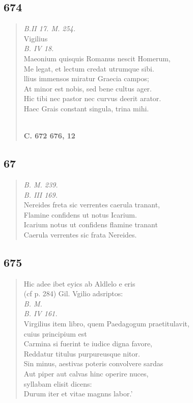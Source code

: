 \documentclass[11pt, a4paper]{report}
\begin{document}
            \subsection*{674}
      \begin{verse}
      \textit{B.II 17. M. 254.} \\ Vigilius \\ \textit{B. IV 18.} \\ Maeonium quisquis Romanus nescit Homerum, \\ Me legat, et lectum credat utrumque sibi. \\ llius immensos miratur Graecia campos; \\ At minor est nobis, sed bene cultus ager. \\ Hic tibi nec pastor nec curvus deerit arator. \\ Haec Grais constant singula, trina mihi. \\ 
        ﻿\pagebreak 
    \begin{center} \textbf{C. 672 676, 12} \end{center} \marginpar{[151]} 
      \end{verse}
  
            \subsection*{67}
      \begin{verse}
      \textit{B. M. 239.} \\ \textit{B. III 169.} \\ Nereides freta sic verrentes caerula tranant, \\ Flamine confidens ut notus Icarium. \\ Icarium notus ut confidens flamine tranant \\ Caerula verrentes sic frata Nereides. \\ 
      \end{verse}
  
            \subsection*{675}
      \begin{verse}
      Hic adee ibet eyics ab Aldlelo e eris \\ (cf p. 284) Gil. Vgilio adsriptos: \\ \textit{B. M.} \\ \textit{B. IV 161.} \\ Virgilius item libro, quem Paedagogum praetitulavit, \\ cuius principium est \\ Carmina si fuerint te iudice digna favore, \\ Reddatur titulus purpureusque nitor. \\ Sin minus, aestivas poteris convolvere sardas \\ Aut piper aut calvas hinc operire nuces, \\ syllabam elisit dicens: \\ Durum iter et vitae magnns labor.’ \\ 
      \end{verse}
  
\end{document}
